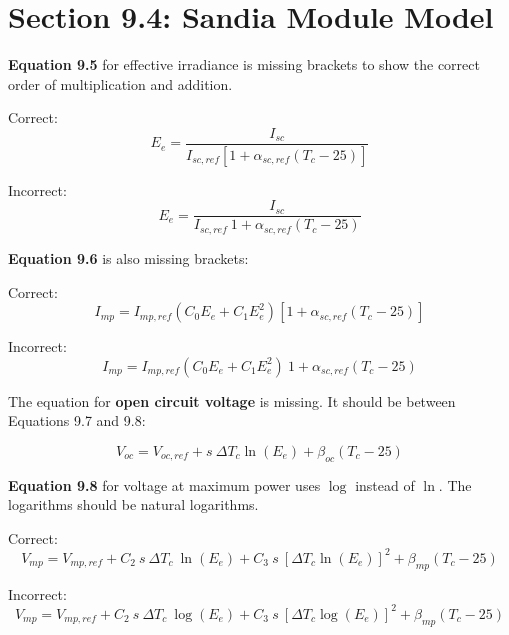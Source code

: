 \documentclass[report]{nrel}
\begin{document}
\section*{Section 9.4: Sandia Module Model}

\textbf{Equation 9.5} for effective irradiance is missing brackets to show the correct order of multiplication and addition.

Correct:
\begin{equation*}
E_e = \frac{I_{sc}}{I_{sc,ref} \left[1 + \alpha_{sc,ref} (T_c - 25)\right]}
\end{equation*}

Incorrect:
\begin{equation*}
E_e = \frac{I_{sc}}{I_{sc,ref}~1 + \alpha_{sc,ref} (T_c - 25)}
\end{equation*}

\textbf{Equation 9.6} is also missing brackets:

Correct:
\begin{equation*}
I_{mp} = I_{mp,ref} (C_0 E_e + C_1 E_e^2) \left[1 + \alpha_{sc,ref} (T_c - 25)\right]
\end{equation*}

Incorrect:
\begin{equation*}
I_{mp} = I_{mp,ref} (C_0 E_e + C_1 E_e^2)~1 + \alpha_{sc,ref} (T_c - 25)
\end{equation*}

The equation for \textbf{open circuit voltage} is missing. It should be between Equations 9.7 and 9.8:

\begin{equation*}
V_{oc} = V_{oc,ref}+ s~\Delta T_c \ln(E_e)+ \beta_{oc} (T_c - 25)
\end{equation*}

\textbf{Equation 9.8} for voltage at maximum power uses $\log$ instead of $\ln$. The logarithms  should be natural logarithms.

Correct:
\begin{equation*}
V_{mp} = V_{mp,ref} +
 C_2~s~\Delta T_c~\ln(E_e) +
 C_3~s~\left[\Delta T_c \ln(E_e)\right]^2 +
 \beta_{mp} (T_c - 25)
\end{equation*}

Incorrect:
\begin{equation*}
V_{mp} = V_{mp,ref} +
 C_2~s~\Delta T_c~\log(E_e) +
 C_3~s~\left[\Delta T_c \log(E_e)\right]^2 +
 \beta_{mp} (T_c - 25)
\end{equation*}
\end{document}
